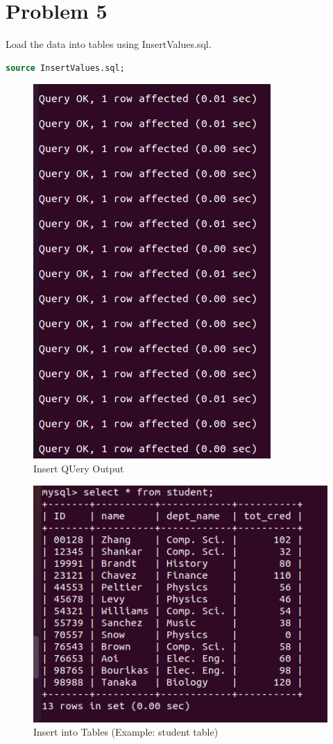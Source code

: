 \documentclass{article}
\begin{document}
\newpage
\section{Problem 5}
Load the data into tables using InsertValues.sql.
\begin{lstlisting}[language=sql]
  source InsertValues.sql;
\end{lstlisting}
\begin{figure}[!ht]
  \begin{center}
  \includegraphics[scale=0.6]{Q5_2.png}
  \caption{Insert QUery Output}
  \end{center}
\end{figure}
\begin{figure}[!ht]
  \begin{center}
  \includegraphics[scale=0.6]{Q5.png}
  \caption{Insert into Tables (Example: student table)}
  \end{center}
\end{figure}
\end{document}
